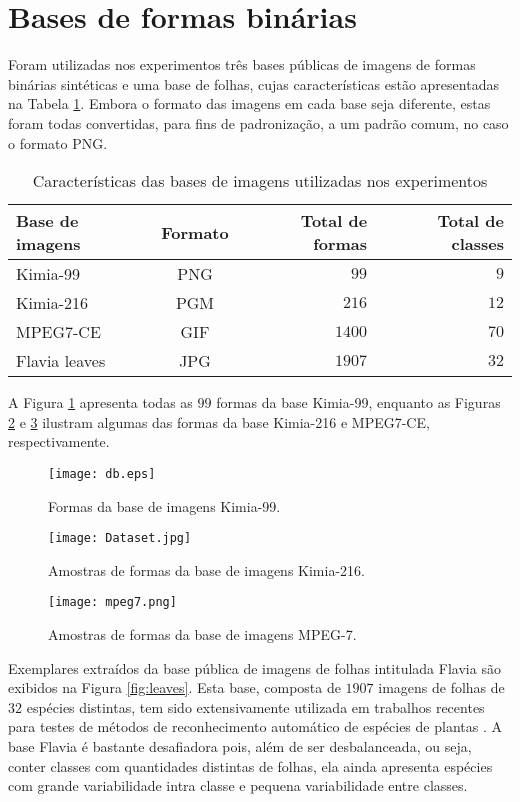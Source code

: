 \section{Bases de formas binárias}

Foram utilizadas nos experimentos três bases públicas de imagens de formas binárias sintéticas e uma base de folhas, cujas características estão apresentadas na Tabela \ref{tbl:bases}. Embora o formato das imagens em cada base seja diferente, estas foram todas convertidas, para fins de padronização, a um padrão comum, no caso o formato PNG. 

\begin{table}[]
	\centering
	\caption{Características das bases de imagens utilizadas nos experimentos}
	\label{tbl:bases}
	\begin{tabular}{lcrr}
		\toprule
		Base de imagens       & Formato & Total de formas & Total de classes \\
		\midrule
		Kimia-99      & PNG & $99$   & $9$     \\
		Kimia-216     & PGM & $216$  & $12$    \\
		MPEG7-CE      & GIF & $1400$ & $70$    \\
		Flavia leaves & JPG & $1907$ & $32$\\
		\bottomrule
	\end{tabular}
\end{table}

A Figura \ref{fig:db1} apresenta todas as $99$ formas da base Kimia-99, enquanto as Figuras \ref{fig:db2} e \ref{fig:db3} ilustram algumas das formas da base Kimia-216 e MPEG7-CE, respectivamente.

\begin{figure}[h!]
	\caption{\label{fig:db1} Formas da base de imagens Kimia-99.}
	\centering
	\texttt{[image: db.eps]}
\end{figure}

\begin{figure}[h!]
	\caption{\label{fig:db2} Amostras de formas da base de imagens Kimia-216.}
	\centering
	\texttt{[image: Dataset.jpg]}
\end{figure}

\begin{figure}[h!]
	\caption{\label{fig:db3} Amostras de formas da base de imagens MPEG-7.}
	\centering
	\texttt{[image: mpeg7.png]}
\end{figure}

Exemplares extraídos da base pública de imagens de folhas intitulada Flavia \cite{4458016} são exibidos na Figura \ref{fig:leaves}. Esta base, composta de  $1907$ imagens de folhas de $32$ espécies distintas, tem sido extensivamente utilizada em trabalhos recentes para testes de métodos de reconhecimento automático de espécies de plantas \cite{wang2015march,quteprints78723,Quadri:2015,Chaki201561}. A base Flavia é bastante desafiadora pois, além de ser desbalanceada, ou seja,  conter classes com quantidades distintas de folhas, ela ainda apresenta espécies com grande variabilidade intra classe e pequena variabilidade entre classes.


